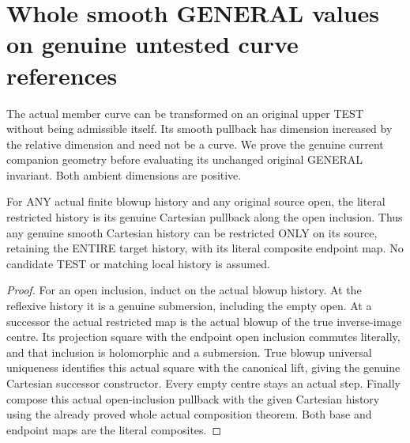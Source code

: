 \section{Whole smooth GENERAL values on genuine untested curve references}

The actual member curve can be transformed on an original upper TEST
without being admissible itself. Its smooth pullback has dimension
increased by the relative dimension and need not be a curve. We prove
the genuine current companion geometry before evaluating its unchanged
original GENERAL invariant. Both ambient dimensions are positive.

\begin{theorem}
\label{hir:original-untested-source-open-actual-cartesian-history}
\leanok
For ANY actual finite blowup history and any original source open, the
literal restricted history is its genuine Cartesian pullback along the
open inclusion. Thus any genuine smooth Cartesian history can be
restricted ONLY on its source, retaining the ENTIRE target history,
with its literal composite endpoint map. No candidate TEST or matching
local history is assumed.
\end{theorem}
\begin{proof}
For an open inclusion, induct on the actual blowup history. At the
reflexive history it is a genuine submersion, including the empty open.
At a successor the actual restricted map is the actual blowup of the
true inverse-image centre. Its projection square with the endpoint
open inclusion commutes literally, and that inclusion is holomorphic
and a submersion. True blowup universal uniqueness identifies this
actual square with the canonical lift, giving the genuine Cartesian
successor constructor. Every empty centre stays an actual step.
Finally compose this actual open-inclusion pullback with the given
Cartesian history using the already proved whole actual composition
theorem. Both base and endpoint maps are the literal composites.
\end{proof}

